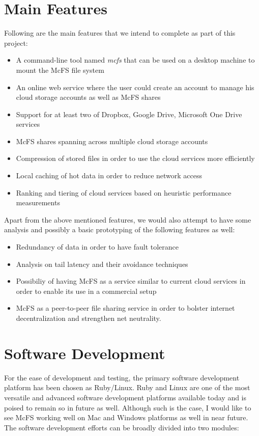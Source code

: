 \section{Main Features}
Following are the main features that we intend to complete as part of this project:
\begin{itemize}
	\item A command-line tool named \emph{mcfs} that can be used on a desktop machine to mount the McFS file system
	\item An online web service where the user could create an account to manage his cloud storage accounts as well as McFS shares
	\item Support for at least two of Dropbox, Google Drive, Microsoft One Drive services
	\item McFS shares spanning across multiple cloud storage accounts
	\item Compression of stored files in order to use the cloud services more efficiently
	\item Local caching of hot data in order to reduce network access
	\item Ranking and tiering of cloud services based on heuristic performance measurements
\end{itemize}

Apart from the above mentioned features, we would also attempt to have some analysis and possibly a basic prototyping of the following features as well:
\begin{itemize}
	\item Redundancy of data in order to have fault tolerance
	\item Analysis on tail latency and their avoidance techniques
	\item Possibiliy of having McFS as a service similar to current cloud services in order to enable its use in a commercial setup
	\item McFS as a peer-to-peer file sharing service in order to bolster internet decentralization and strengthen net neutrality.
\end{itemize}


\section{Software Development}
For the ease of development and testing, the primary software development platform has been chosen as Ruby/Linux. Ruby and Linux are one of the most versatile and advanced software development platforms available today and is poised to remain so in future as well. Although such is the case, I would like to see McFS working well on Mac and Windows platforms as well in near future. The software development efforts can be broadly divided into two modules:

